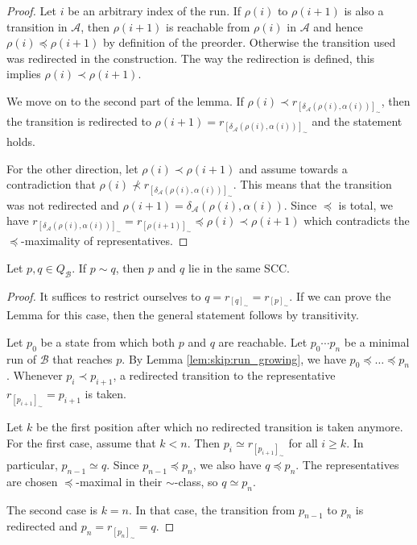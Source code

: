 \begin{proof}
	Let $i$ be an arbitrary index of the run. If $\rho(i)$ to $\rho(i+1)$ is also a transition in $\mathcal{A}$, then $\rho(i+1)$ is reachable from $\rho(i)$ in $\mathcal{A}$ and hence $\rho(i) \preceq \rho(i+1)$ by definition of the preorder. Otherwise the transition used was redirected in the construction. The way the redirection is defined, this implies $\rho(i) \prec \rho(i+1)$.
	
	We move on to the second part of the lemma. If $\rho(i) \prec r_{[\delta_\mathcal{A}(\rho(i), \alpha(i))]_\sim}$, then the transition is redirected to $\rho(i+1) = r_{[\delta_\mathcal{A}(\rho(i), \alpha(i))]_\sim}$ and the statement holds. 
	
	For the other direction, let $\rho(i) \prec \rho(i+1)$ and assume towards a contradiction that $\rho(i) \not\prec r_{[\delta_\mathcal{A}(\rho(i), \alpha(i))]_\sim}$. This means that the transition was not redirected and $\rho(i+1) = \delta_\mathcal{A}(\rho(i), \alpha(i))$. Since $\preceq$ is total, we have $r_{[\delta_\mathcal{A}(\rho(i), \alpha(i))]_\sim} = r_{[\rho(i+1)]_\sim} \preceq \rho(i) \prec \rho(i+1)$ which contradicts the $\preceq$-maximality of representatives.
\end{proof}

\begin{lem}
\label{lem:skip:equiv_same_scc}
	Let $p, q \in Q_\mathcal{B}$. If $p \sim q$, then $p$ and $q$ lie in the same SCC. 
\end{lem}

\begin{proof}
	It suffices to restrict ourselves to $q = r_{[q]_\sim} = r_{[p]_\sim}$. If we can prove the Lemma for this case, then the general statement follows by transitivity.
	
	Let $p_0$ be a state from which both $p$ and $q$ are reachable. Let $p_0 \cdots p_n$ be a minimal run of $\mathcal{B}$ that reaches $p$. By Lemma \ref{lem:skip:run_growing}, we have $p_0 \preceq \dots \preceq p_n$. Whenever $p_i \prec p_{i+1}$, a redirected transition to the representative $r_{[p_{i+1}]_\sim} = p_{i+1}$ is taken. 
	
	Let $k$ be the first position after which no redirected transition is taken anymore. For the first case, assume that $k < n$. Then $p_i \simeq r_{[p_{i+1}]_\sim}$ for all $i \geq k$. In particular, $p_{n-1} \simeq q$. Since $p_{n-1} \preceq p_n$, we also have $q \preceq p_n$. The representatives are chosen $\preceq$-maximal in their $\sim$-class, so $q \simeq p_n$.
	
	The second case is $k = n$. In that case, the transition from $p_{n-1}$ to $p_n$ is redirected and $p_n = r_{[p_n]_\sim} = q$.
\end{proof}


